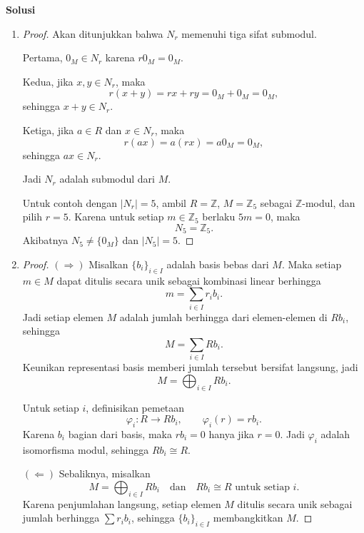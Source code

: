 \documentclass[11pt,a4paper]{article}
\begin{document}
\newpage
\begin{center}
  \textbf{Solusi}
\end{center}

\begin{enumerate}
  \item        \begin{proof}
          Akan ditunjukkan bahwa $N_r$ memenuhi tiga sifat submodul.

          Pertama, $0_M \in N_r$ karena $r0_M = 0_M$.

          Kedua, jika $x,y \in N_r$, maka
          \[
            r(x+y) = rx + ry = 0_M + 0_M = 0_M,
          \]
          sehingga $x+y \in N_r$.

          Ketiga, jika $a \in R$ dan $x \in N_r$, maka
          \[
            r(ax) = a(rx) = a0_M = 0_M,
          \]
          sehingga $ax \in N_r$.

          Jadi $N_r$ adalah submodul dari $M$.

          Untuk contoh dengan $|N_r|=5$, ambil $R=\mathbb{Z}$, $M=\mathbb{Z}_5$ sebagai $\mathbb{Z}$-modul, dan pilih $r=5$. Karena untuk setiap $m \in \mathbb{Z}_5$ berlaku $5m=0$, maka
          \[
            N_5 = \mathbb{Z}_5.
          \]
          Akibatnya $N_5 \neq \{0_M\}$ dan $|N_5|=5$.
        \end{proof}

  \item         \begin{proof}
          $(\Rightarrow)$ Misalkan $\{b_i\}_{i\in I}$ adalah basis bebas dari $M$. Maka setiap $m \in M$ dapat ditulis secara unik sebagai kombinasi linear berhingga
          \[
            m = \sum_{i\in I} r_i b_i.
          \]
          Jadi setiap elemen $M$ adalah jumlah berhingga dari elemen-elemen di $Rb_i$, sehingga
          \[
            M = \sum_{i\in I} Rb_i.
          \]
          Keunikan representasi basis memberi jumlah tersebut bersifat langsung, jadi
          \[
            M = \bigoplus_{i\in I} Rb_i.
          \]

          Untuk setiap $i$, definisikan pemetaan
          \[
            \varphi_i : R \to Rb_i, \qquad \varphi_i(r)=rb_i.
          \]
          Karena $b_i$ bagian dari basis, maka $rb_i=0$ hanya jika $r=0$. Jadi $\varphi_i$ adalah isomorfisma modul, sehingga $Rb_i \cong R$.

          $(\Leftarrow)$ Sebaliknya, misalkan
          \[
            M = \bigoplus_{i\in I} Rb_i
            \quad \text{dan} \quad Rb_i \cong R \text{ untuk setiap } i.
          \]
          Karena penjumlahan langsung, setiap elemen $M$ ditulis secara unik sebagai jumlah berhingga $\sum r_i b_i$, sehingga $\{b_i\}_{i\in I}$ membangkitkan $M$.


\end{proof}
\end{enumerate}
\end{document}
